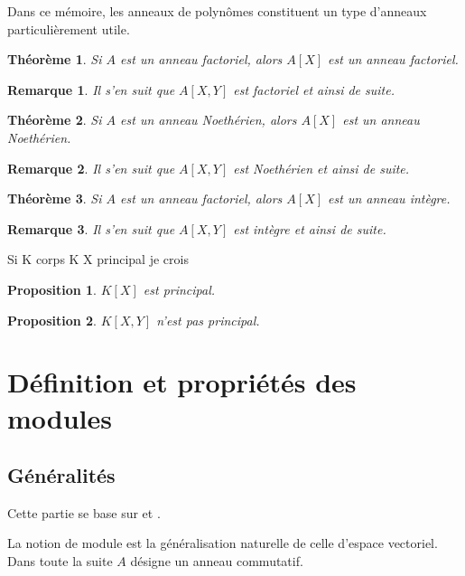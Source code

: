 \documentclass[a4paper,12pt]{report}  %
\theoremstyle{definitionstyle}
\theoremstyle{examplestyle}
\theoremstyle{remarkstyle}
\newtheorem{remark}{Remarque}[chapter] %
\theoremstyle{propositionstyle}
\newtheorem{proposition}{Proposition}[chapter]  %
\theoremstyle{theoremstyle}
\newtheorem{theoreme}{Théorème}[chapter]  %
\theoremstyle{proofstyle}
\begin{document}
	Dans ce mémoire, les anneaux de polynômes constituent un type d'anneaux particulièrement utile.
	
	\begin{theoreme}
	Si $A$ est un anneau factoriel, alors $A[X]$ est un anneau factoriel.
	\end{theoreme}

	\begin{remark}
		Il s'en suit que $A[X, Y]$ est factoriel et ainsi de suite.
	\end{remark}

	\begin{theoreme}
		Si $A$ est un anneau Noethérien, alors $A[X]$ est un anneau Noethérien.
	\end{theoreme}
	
	\begin{remark}
		Il s'en suit que $A[X, Y]$ est Noethérien et ainsi de suite.
	\end{remark}

	\begin{theoreme}
		Si $A$ est un anneau factoriel, alors $A[X]$ est un anneau intègre.
	\end{theoreme}
	
	\begin{remark}
		Il s'en suit que $A[X, Y]$ est intègre et ainsi de suite.
	\end{remark}

	Si K corps K X principal je crois
	
	\begin{proposition}
		$K[X]$ est principal.
	\end{proposition}

	\begin{proposition}
		$K[X, Y]$ n'est pas principal.
	\end{proposition}
	
	\section{Définition et propriétés des modules} %
	
	\subsection{Généralités}
	Cette partie se base sur \cite{ring_modules} et \cite{harari_modules}.
	
	La notion de module est la généralisation naturelle de celle d'espace vectoriel. Dans toute la suite $A$ désigne un anneau commutatif.
	
\end{document}

